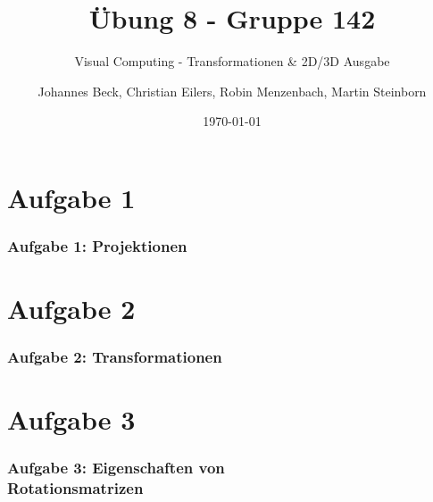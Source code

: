 \documentclass[accentcolor=tud9c,colorbacktitle,inverttitle,landscape,german,presentation,t]{tudbeamer}
\begin{document}
\title{\"Ubung 8 - Gruppe 142} 
\subtitle{Visual Computing - Transformationen \& 2D/3D Ausgabe} 

\author[Johannes Beck, Christian Eilers, Robin Menzenbach, Martin Steinborn]{Johannes Beck, Christian Eilers, Robin Menzenbach, Martin Steinborn}


\date{\today}

\begin{titleframe}
\end{titleframe}

\section{Aufgabe 1}
	\begin{frame}
		\frametitle{Aufgabe 1: Projektionen}
	\end{frame}

\section{Aufgabe 2}
\begin{frame}
	\frametitle{Aufgabe 2: Transformationen}
\end{frame}

\section{Aufgabe 3}
\begin{frame}
	\frametitle{Aufgabe 3: Eigenschaften von\\ Rotationsmatrizen}%
\end{frame}
\end{document}
